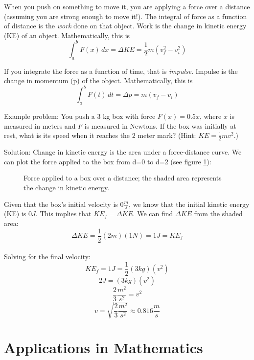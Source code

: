 When you push on something to move it, you are applying a force over 
a distance (assuming you are strong enough to move it!). The integral 
of force as a function of distance is the \textit{work} done on that 
object.  Work is the change in kinetic energy (KE) of an object. 
Mathematically, this is $$\int_{a}^{b} F(x)\,dx = \Delta KE = 
\frac{1}{2} m (v_f^2 - v_i^2)$$

If you integrate the force as a function of time, that is 
\textit{impulse}. Impulse is the change in momentum (p) of the 
object. Mathematically, this is $$\int_{a}^{b} F(t)\,dt = \Delta p 
= m (v_f - v_i)$$

Example problem: You push a 3 kg box with force $F(x) = 0.5x$, where 
$x$ is measured in meters and $F$ is measured in Newtons. If the box 
was initially at rest, what is its speed when it reaches the 2 meter 
mark? (Hint: $KE = \frac{1}{2} m v^2$.) 

Solution: Change in kinetic energy is the area under a force-distance 
curve. We can plot the force applied to the box from d=0 to d=2 (see 
figure \ref{fig:KEbox}):

\begin{figure}[htbp]
 \caption{Force applied to a box over a distance; the shaded area 
 represents the change in kinetic energy.}
 \label{fig:KEbox}
\end{figure}

Given that the box's initial velocity is $0 \frac{m}{s}$, we know that 
the initial kinetic energy (KE) is $0J$. This implies that $KE_f = 
\Delta KE$. We can find $\Delta KE$ from the shaded area:\\
$$\Delta KE = \frac{1}{2} (2m) (1N) = 1 J = KE_f$$\\
Solving for the final velocity:\\
$$KE_f = 1 J = \frac{1}{2}(3kg)(v^2)$$
$$2 J = (3 kg) (v^2)$$
$$\frac{2}{3} \frac{m^2}{s^2} = v^2$$
$$v=\sqrt{\frac{2}{3} \frac{m^2}{s^2}} \approx 0.816 \frac{m}{s}$$


\section{Applications in Mathematics}

